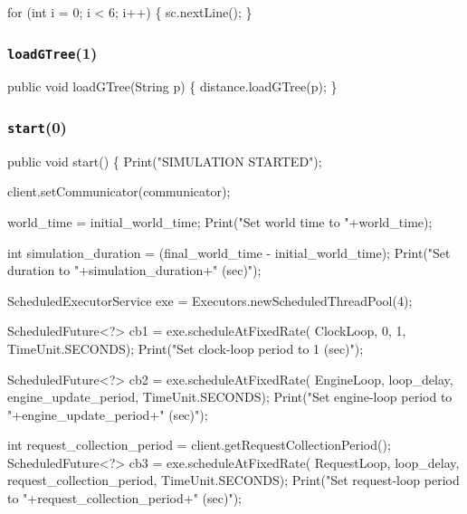 \documentclass{article}
\def\nwendcode{\endtrivlist \endgroup}      %
\let\nwdocspar=\par
\begin{document}
for (int i = 0; i < 6; i++) \{
  sc.nextLine();
\}
\nwendcode{}\nwdocspar

\subsubsection{{\tt{}\protect{}loadGTree}(1)}
\nwenddocs{}\endmoddef{}
public void loadGTree(String p) \{
  distance.loadGTree(p);
\}
\eatline
{}\nwendcode{}\nwdocspar
\subsubsection{{\tt{}\protect{}start}(0)}
\nwenddocs{}\endmoddef{}
public void start() \{
  Print("SIMULATION STARTED");

  client.setCommunicator(communicator);

  world_time = initial_world_time;
  Print("Set world time to "+world_time);

  int simulation_duration = (final_world_time - initial_world_time);
  Print("Set duration to "+simulation_duration+" (sec)");

  ScheduledExecutorService exe = Executors.newScheduledThreadPool(4);

  ScheduledFuture<?> cb1 = exe.scheduleAtFixedRate(
    ClockLoop, 0, 1, TimeUnit.SECONDS);
  Print("Set clock-loop period to 1 (sec)");

  ScheduledFuture<?> cb2 = exe.scheduleAtFixedRate(
    EngineLoop, loop_delay, engine_update_period, TimeUnit.SECONDS);
  Print("Set engine-loop period to "+engine_update_period+" (sec)");

  int request_collection_period = client.getRequestCollectionPeriod();
  ScheduledFuture<?> cb3 = exe.scheduleAtFixedRate(
    RequestLoop, loop_delay, request_collection_period, TimeUnit.SECONDS);
  Print("Set request-loop period to "+request_collection_period+" (sec)");
\end{document}
